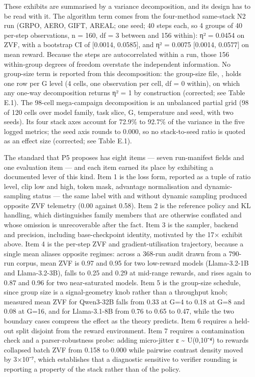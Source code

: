 \documentclass[12pt,a4paper]{report}
\newcommand{\longtok}[1]{\texttt{\seqsplit{#1}}}
\begin{document}
These exhibits are summarised by a variance decomposition, and its
design has to be read with it. The algorithm term comes from the
four-method same-stack N2 run (GRPO, AERO, GIFT, AREAL; one seed; 40
steps each, so 4 groups of 40 per-step observations, n = 160, df = 3
between and 156 within): η² = 0.0454 on ZVF, with a bootstrap CI of
{[}0.0014, 0.0585{]}, and η² = 0.0075 {[}0.0014, 0.0577{]} on mean
reward. Because the steps are autocorrelated within a run, those 156
within-group degrees of freedom overstate the independent information.
No group-size term is reported from this decomposition: the group-size
file, \longtok{groupsize\_\allowbreak{}zvf\_\allowbreak{}sweep.tsv}, holds one row per G level (4
cells, one observation per cell, df = 0 within), on which any one-way
decomposition returns η² = 1 by construction (corrected; see Table E.1).
The 98-cell mega-campaign decomposition is an unbalanced partial grid
(98 of 120 cells over model family, task slice, G, temperature and seed,
with two seeds). Its four stack axes account for 72.9\% to 92.7\% of the
variance in the five logged metrics; the seed axis rounds to 0.000, so
no stack-to-seed ratio is quoted as an effect size (corrected; see Table
E.1).

The standard that P5 proposes has eight items --- seven run-manifest
fields and one evaluation item --- and each item earned its place by
exhibiting a documented lever of this kind. Item 1 is the loss form,
reported as a tuple of ratio level, clip low and high, token mask,
advantage normalisation and dynamic-sampling status --- the same label
with and without dynamic sampling produced opposite ZVF telemetry (0.00
against 0.58). Item 2 is the reference policy and KL handling, which
distinguishes family members that are otherwise conflated and whose
omission is unrecoverable after the fact. Item 3 is the sampler, backend
and precision, including base-checkpoint identity, motivated by the 17×
exhibit above. Item 4 is the per-step ZVF and gradient-utilisation
trajectory, because a single mean aliases opposite regimes: across a
368-run audit drawn from a 790-run corpus, mean ZVF is 0.97 and 0.95 for
two low-reward models (Llama-3.2-1B and Llama-3.2-3B), falls to 0.25 and
0.29 at mid-range rewards, and rises again to 0.87 and 0.96 for two
near-saturated models. Item 5 is the group-size schedule, since group
size is a signal-geometry knob rather than a throughput knob; measured
mean ZVF for Qwen3-32B falls from 0.33 at G=4 to 0.18 at G=8 and 0.08 at
G=16, and for Llama-3.1-8B from 0.76 to 0.65 to 0.47, while the two
boundary cases compress the effect as the theory predicts. Item 6
requires a held-out split disjoint from the reward environment. Item 7
requires a contamination check and a parser-robustness probe: adding
micro-jitter ε \textasciitilde{} U(0,10⁻⁴) to rewards collapsed batch
ZVF from 0.158 to 0.000 while pairwise contrast density moved by 3×10⁻⁷,
which establishes that a diagnostic sensitive to verifier rounding is
reporting a property of the stack rather than of the policy.
\end{document}
